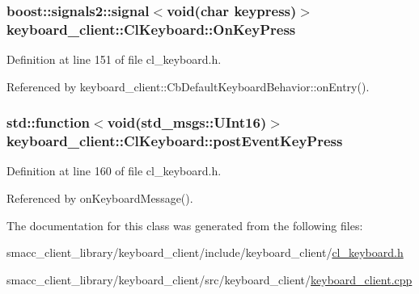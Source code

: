 \subsubsection[{\texorpdfstring{On\+Key\+Press}{OnKeyPress}}]{\setlength{\rightskip}{0pt plus 5cm}boost\+::signals2\+::signal$<$void(char keypress)$>$ keyboard\+\_\+client\+::\+Cl\+Keyboard\+::\+On\+Key\+Press}\hypertarget{classkeyboard__client_1_1ClKeyboard_a771589b55252145020691bfb6ec47adf}{}\label{classkeyboard__client_1_1ClKeyboard_a771589b55252145020691bfb6ec47adf}


Definition at line 151 of file cl\+\_\+keyboard.\+h.



Referenced by keyboard\+\_\+client\+::\+Cb\+Default\+Keyboard\+Behavior\+::on\+Entry().

\subsubsection[{\texorpdfstring{post\+Event\+Key\+Press}{postEventKeyPress}}]{\setlength{\rightskip}{0pt plus 5cm}std\+::function$<$void(std\+\_\+msgs\+::\+U\+Int16)$>$ keyboard\+\_\+client\+::\+Cl\+Keyboard\+::post\+Event\+Key\+Press}\hypertarget{classkeyboard__client_1_1ClKeyboard_aadd675eea47a012b348a4e6c00e7e9d0}{}\label{classkeyboard__client_1_1ClKeyboard_aadd675eea47a012b348a4e6c00e7e9d0}


Definition at line 160 of file cl\+\_\+keyboard.\+h.



Referenced by on\+Keyboard\+Message().



The documentation for this class was generated from the following files\+:\begin{DoxyCompactItemize}
\item 
smacc\+\_\+client\+\_\+library/keyboard\+\_\+client/include/keyboard\+\_\+client/\hyperlink{cl__keyboard_8h}{cl\+\_\+keyboard.\+h}\item 
smacc\+\_\+client\+\_\+library/keyboard\+\_\+client/src/keyboard\+\_\+client/\hyperlink{keyboard__client_8cpp}{keyboard\+\_\+client.\+cpp}\end{DoxyCompactItemize}
